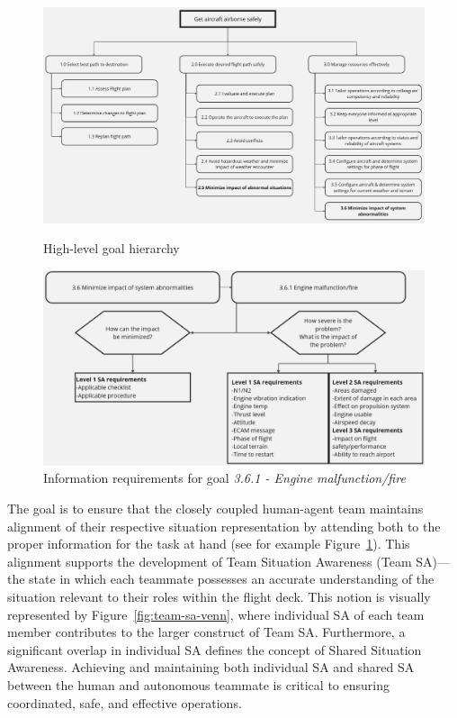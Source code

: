 \documentclass[12pt,a4paper]{article} %
\begin{document}
	\begin{figure}[H]
		\centering
		\begin{minipage}[b]{1\textwidth}
			\centering
			\includegraphics[width=1\textwidth]{./images/gdta_goal_hierarchy.jpg}
			\caption{High-level goal hierarchy}
			\label{fig:goal-hierarchy}
		\end{minipage}
		\begin{minipage}[b]{1\textwidth}
			\centering
			\includegraphics[width=1\textwidth]{images/goal_and_info_req.jpg}
			\caption{Information requirements for goal \textit{3.6.1 - Engine malfunction/fire}}
			\label{fig:info_req}
		\end{minipage}
	\end{figure}

	The goal is to ensure that the closely coupled human-agent team maintains alignment of their respective situation representation by attending both to the proper information for the task at hand (see for example Figure~\ref{fig:info_req}). This alignment supports the development of Team Situation Awareness (Team SA)—the state in which each teammate possesses an accurate understanding of the situation relevant to their roles within the flight deck.
	This notion is visually represented by Figure~\ref{fig:team-sa-venn}, where individual SA of each team member contributes to the larger construct of Team SA. Furthermore, a significant overlap in individual SA defines the concept of Shared Situation Awareness. Achieving and maintaining both individual SA and shared SA between the human and autonomous teammate is critical to ensuring coordinated, safe, and effective operations.
\end{document}
